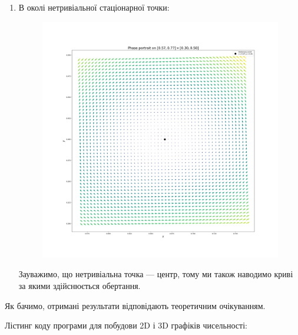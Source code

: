 \begin{enumerate}
	\item В околі нетривіальної стаціонарної точки:
	\begin{figure}
		\centering
		\includegraphics[width=\textwidth]{phase_0.57_0.77_0.30_0.50_50.png}
	\end{figure}

	Зауважимо, що нетривіальна точка --- центр, тому ми також наводимо криві за якими здійснюється обертання.
\end{enumerate}

Як бачимо, отримані результати відповідають теоретичним очікуванням. \medskip

Лістинг коду програми для побудови 2D і 3D графіків чисельності:
\inputminted{python}{py/plots.py}

